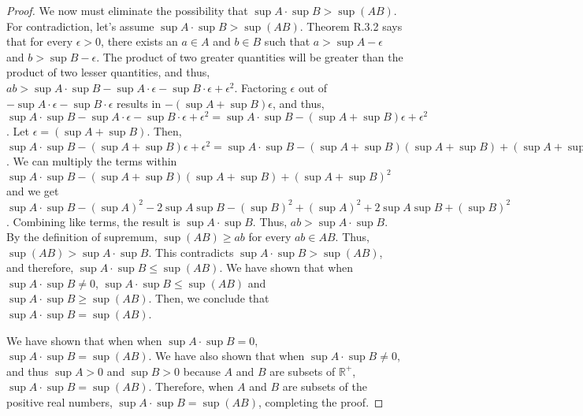 \documentclass[11 pt]{article}
\newcommand{\newpar}{\vspace{.15in}\noindent}
\begin{document}
\begin{proof}
\newpar
We now must eliminate the possibility that $\sup A\cdot\sup B>\sup(AB)$. For contradiction, let's assume $\sup A\cdot\sup B>\sup(AB)$. Theorem R.3.2 says that for every $\epsilon>0$, there exists an $a\in A$ and $b\in B$ such that $a>\sup A-\epsilon$ and $b>\sup B-\epsilon$. The product of two greater quantities will be greater than the product of two lesser quantities, and thus, $ab>\sup A\cdot\sup B-\sup A\cdot\epsilon -\sup B\cdot\epsilon+\epsilon^2$. Factoring $\epsilon$ out of $-\sup A\cdot\epsilon -\sup B\cdot\epsilon$ results in $-(\sup A+\sup B)\epsilon$, and thus, $\sup A\cdot\sup B-\sup A\cdot\epsilon -\sup B\cdot\epsilon+\epsilon^2=\sup A\cdot\sup B-(\sup A+\sup B)\epsilon+\epsilon^2$. Let $\epsilon=(\sup A+\sup B)$. Then, $\sup A\cdot\sup B-(\sup A+\sup B)\epsilon+\epsilon^2=\sup A\cdot\sup B-(\sup A+\sup B)(\sup A+\sup B)+(\sup A+\sup B)^2$. We can multiply the terms within $\sup A\cdot\sup B-(\sup A+\sup B)(\sup A+\sup B)+(\sup A+\sup B)^2$ and we get $\sup A\cdot\sup B-(\sup A)^2-2\sup A\sup B-(\sup B)^2+(\sup A)^2+2\sup A\sup B+(\sup B)^2$. Combining like terms, the result is $\sup A\cdot\sup B$. Thus, $ab>\sup A\cdot\sup B$. By the definition of supremum, $\sup(AB)\ge ab$ for every $ab\in AB$. Thus, $\sup(AB)>\sup A\cdot\sup B$. This contradicts $\sup A\cdot\sup B>\sup(AB)$, and therefore, $\sup A\cdot\sup B\le\sup(AB)$. We have shown that when $\sup A\cdot\sup B\neq0$, $\sup A\cdot\sup B\le\sup(AB)$ and $\sup A\cdot\sup B\ge\sup(AB)$. Then, we conclude that $\sup A\cdot\sup B=\sup(AB)$.

\newpar
We have shown that when when $\sup A\cdot\sup B=0$, $\sup A\cdot\sup B=\sup(AB)$. We have also shown that when $\sup A\cdot\sup B\neq0$, and thus $\sup A>0$ and $\sup B>0$ because $A$ and $B$ are subsets of $\mathbb{R}^+$, $\sup A\cdot\sup B=\sup(AB)$. Therefore, when $A$ and $B$ are subsets of the positive real numbers, $\sup A\cdot\sup B=\sup(AB)$, completing the proof.
\end{proof}
\end{document}

